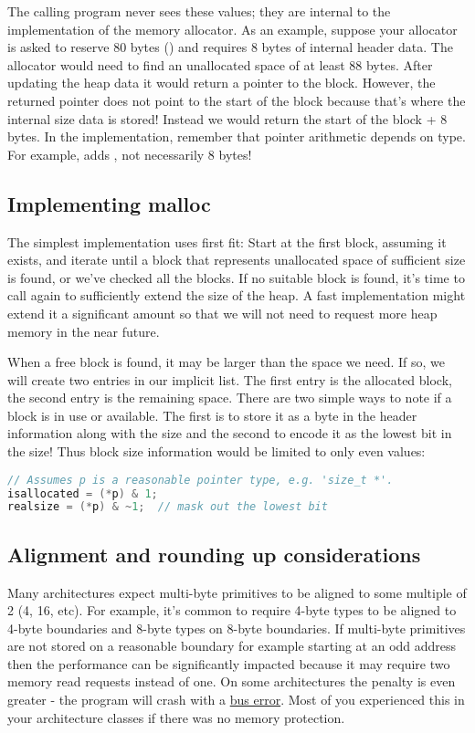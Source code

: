 The calling program never sees these values; they are internal to the implementation of the memory allocator.
As an example, suppose your allocator is asked to reserve 80 bytes () and requires 8 bytes of internal header data.
The allocator would need to find an unallocated space of at least 88 bytes.
After updating the heap data it would return a pointer to the block.
However, the returned pointer does not point to the start of the block because that's where the internal size data is stored! Instead we would return the start of the block + 8 bytes.
In the implementation, remember that pointer arithmetic depends on type. For example,  adds , not necessarily 8 bytes!

\subsection{Implementing malloc}

The simplest implementation uses first fit: Start at the first block, assuming it exists, and iterate until a block that represents unallocated space of sufficient size is found, or we've checked all the blocks.
If no suitable block is found, it's time to call  again to sufficiently extend the size of the heap.
A fast implementation might extend it a significant amount so that we will not need to request more heap memory in the near future.

When a free block is found, it may be larger than the space we need.
If so, we will create two entries in our implicit list.
The first entry is the allocated block, the second entry is the remaining space.
There are two simple ways to note if a block is in use or available.
The first is to store it as a byte in the header information along with the size and the second to encode it as the lowest bit in the size!
Thus block size information would be limited to only even values:

\begin{lstlisting}[language=C]
// Assumes p is a reasonable pointer type, e.g. 'size_t *'.
isallocated = (*p) & 1;
realsize = (*p) & ~1;  // mask out the lowest bit
\end{lstlisting}

\subsection{Alignment and rounding up considerations}

Many architectures expect multi-byte primitives to be aligned to some multiple of 2 (4, 16, etc).
For example, it's common to require 4-byte types to be aligned to 4-byte boundaries and 8-byte types on 8-byte boundaries.
If multi-byte primitives are not stored on a reasonable boundary for example starting at an odd address then the performance can be significantly impacted because it may require two memory read requests instead of one.
On some architectures the penalty is even greater - the program will crash with a \href{http://en.wikipedia.org/wiki/Bus_error\#Unaligned_access}{bus error}.
Most of you experienced this in your architecture classes if there was no memory protection.

